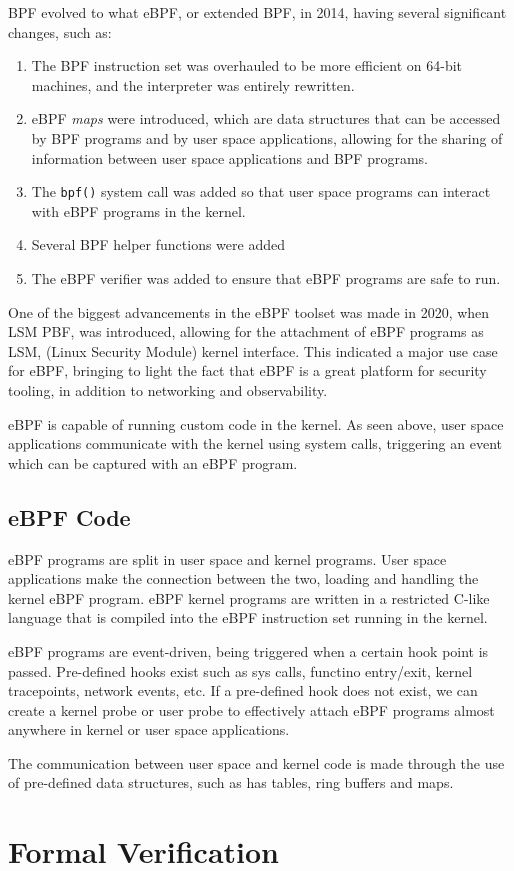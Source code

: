 BPF evolved to what eBPF, or extended BPF, in 2014, having several significant changes, such as:
\begin{enumerate}
    \item The BPF instruction set was overhauled to be more efficient on 64-bit machines, and the interpreter was entirely rewritten.
    \item eBPF \textit{maps} were introduced, which are data structures that can be accessed by BPF programs and by user space applications, allowing for the sharing of information between user space applications and BPF programs.
    \item The \texttt{bpf()} system call was added so that user space programs can interact with eBPF programs in the kernel.
    \item Several BPF helper functions were added
    \item The eBPF verifier was added to ensure that eBPF programs are safe to run.
\end{enumerate}

One of the biggest advancements in the eBPF toolset was made in 2020, when LSM PBF, was introduced, allowing for the attachment of eBPF programs as LSM, (Linux Security Module) kernel interface. This indicated a major use case for eBPF, bringing to light the fact that eBPF is a great platform for security tooling, in addition to networking and observability.

eBPF is capable of running custom code in the kernel. As seen above, user space applications communicate with the kernel using system calls, triggering an event which can be captured with an eBPF program. 

\subsection{eBPF Code}

eBPF programs are split in user space and kernel programs. User space applications make the connection between the two, loading and handling the kernel eBPF program. eBPF kernel programs are written in a restricted C-like language that is compiled into the eBPF instruction set running in the kernel. 

eBPF programs are event-driven, being triggered when a certain hook point is passed. Pre-defined hooks exist such as sys calls, functino entry/exit, kernel tracepoints, network events, etc. If a pre-defined hook does not exist, we can create a kernel probe or user probe to effectively attach eBPF programs almost anywhere in kernel or user space applications. 

The communication between user space and kernel code is made through the use of pre-defined data structures, such as has tables, ring buffers and maps.

\section{Formal Verification}

